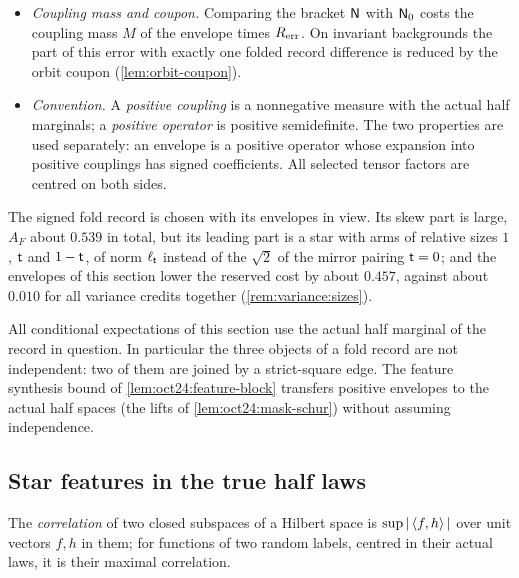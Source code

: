 \begin{itemize}
 record expansion charges $B$, about $2.333$, per full skew monomial, which exceeds
 the raw-arm monomial by the factor $\ell_\tlaw$, about $1.273$, per fold record.
\item \emph{Coupling mass and coupon.} Comparing the bracket $\mathsf N$ with $\mathsf N_0$
 costs the coupling mass $M$ of the envelope times $R_{\rm err}$. On invariant
 backgrounds the part of this error with exactly one folded record difference is
 reduced by the orbit coupon (\cref{lem:orbit-coupon}).
\item \emph{Convention.} A \emph{positive coupling} is a nonnegative measure with
 the actual half marginals; a \emph{positive operator} is positive semidefinite.
 The two properties are used separately: an envelope is a positive operator whose
 expansion into positive couplings has signed coefficients. All selected tensor
 factors are centred on both sides.
\end{itemize}

The signed fold record is chosen with its envelopes in view. Its skew part is
large, $A_F$ about $0.539$ in total, but its leading part is a star with arms of
relative sizes $1$, $\mathsf t$ and $1-\mathsf t$, of norm $\ell_\tlaw$ instead of the
$\sqrt2$ of the mirror pairing $\mathsf t=0$; and the envelopes of this section lower
the reserved cost by about $0.457$, against about $0.010$ for all variance credits
together (\cref{rem:variance:sizes}).

All conditional expectations of this section use the actual half marginal of
the record in question. In particular the three objects of a fold record are
not independent: two of them are joined by a strict-square edge. The feature synthesis bound of \cref{lem:oct24:feature-block} transfers positive envelopes to the actual half spaces (the lifts of \cref{lem:oct24:mask-schur}) without assuming independence.

\subsection{Star features in the true half laws}\label{subsec:oct24:pure-features}

The \emph{correlation} of two closed subspaces of a Hilbert space is
$\sup|\left\langle f,h\right\rangle|$ over unit vectors $f,h$ in them; for functions of two random
labels, centred in their actual laws, it is their maximal correlation.


